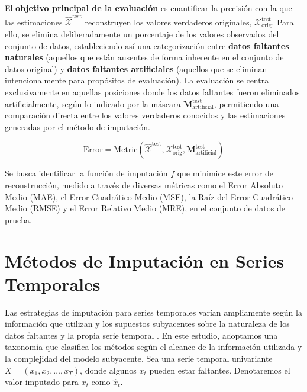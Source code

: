El \textbf{objetivo principal de la evaluación} es cuantificar la precisión con la que las estimaciones $\hat{\mathcal{X}}^{\text{test}}$ reconstruyen los valores verdaderos originales, $\mathcal{X}_{\text{orig}}^{\text{test}}$. Para ello, se elimina deliberadamente un porcentaje de los valores observados del conjunto de datos, estableciendo así una categorización entre \textbf{datos faltantes naturales} (aquellos que están ausentes de forma inherente en el conjunto de datos original) y \textbf{datos faltantes artificiales} (aquellos que se eliminan intencionalmente para propósitos de evaluación).
La evaluación se centra exclusivamente en aquellas posiciones donde los datos faltantes fueron eliminados artificialmente, según lo indicado por la máscara $\mathbf{M}_{\text{artificial}}^{\text{test}}$, permitiendo una comparación directa entre los valores verdaderos conocidos y las estimaciones generadas por el método de imputación. 

\[
\text{Error} = \text{Metric}(\hat{\mathcal{X}}^{\text{test}}, \mathcal{X}_{\text{orig}}^{\text{test}}, \mathbf{M}_{\text{artificial}}^{\text{test}})
\]

Se busca identificar la función de imputación $f$ que minimice este error de reconstrucción, medido a través de diversas métricas como el Error Absoluto Medio (MAE), el Error Cuadrático Medio (MSE), la Raíz del Error Cuadrático Medio (RMSE) y el Error Relativo Medio (MRE), en el conjunto de datos de prueba.


\section{Métodos de Imputación en Series Temporales}
\label{sec:taxonomia_imputacion}

Las estrategias de imputación para series temporales varían ampliamente según la información que utilizan y los supuestos subyacentes sobre la naturaleza de los datos faltantes y la propia serie temporal \citep{Little2019statistical, Schafer1997analysis}. En este estudio, adoptamos una taxonomía que clasifica los métodos según el alcance de la información utilizada y la complejidad del modelo subyacente. Sea una serie temporal univariante $X = (x_1, x_2, \ldots, x_T)$, donde algunos $x_t$ pueden estar faltantes. Denotaremos el valor imputado para $x_t$ como $\hat{x}_t$.

